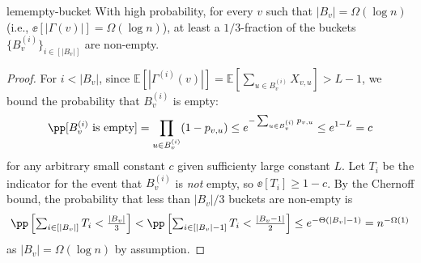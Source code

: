 \begin{restatable}{lem}{empty-bucket}
\label{lem:empty_bucket}
With high probability, for every $v$ such that $|B_v| = \Omega(\log n)$ (i.e., $\ee\left[|\Gamma(v)|\right] = \Omega(\log n)$), at least a $1/3$-fraction of the buckets $\{B_v^{(i)}\}_{i\in[|B_v|]}$ are non-empty.
\end{restatable}
\begin{proof}
For $i < |B_v|$, since $ \mathbb{E} \left[ |\Gamma^{(i)}(v)| \right] =\mathbb{E} \left[ \sum_{u\in B_v^{(i)}} X_{v,u} \right] > L-1$, we bound the probability that $B_v^{(i)}$ is empty:
$$\pp[B_v^{(i)}\textrm{ is empty}] = \prod_{u\in B_v^{(i)}} (1-p_{v,u}) \leq e^{-\sum_{u\in B_v^{(i)}} p_{v,u}} \leq e^{1-L}=c
$$
for any arbitrary small constant $c$ given sufficienty large constant $L$. Let $T_{i}$ be the indicator for the event that $B_v^{(i)}$ is \emph{not} empty, so $\ee[T_i]\geq 1-c$. By the Chernoff bound, the probability that less than $|B_v|/3$ buckets are non-empty is 
$$\textstyle
\pp\left[\sum_{i\in[|B_v|]} T_i<\frac{|B_v|}{3}\right]<\pp\left[\sum_{i\in[|B_v|-1]} T_i<\frac{|B_v-1|}{2}\right]\leq e^{-\Theta(|B_v|-1)} = n^{-\Omega(1)}
$$ as $|B_v| = \Omega(\log n)$ by assumption.
\end{proof}

\label{sec:bucket_fill}




